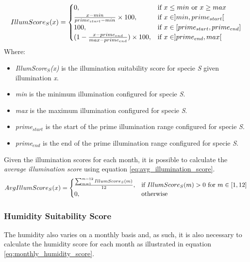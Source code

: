 \begin{equation}
\centering
IllumScore_{S}(x) = 
\begin{cases}
    0, & \text{if } x \leq min \text{ or } x \geq max \\
    \frac{x - min}{prime_{start} - min} \times 100, & \text{if } x \in ]min,prime_{start}[ \\
    100, & \text{if } x \in [prime_{start},prime_{end}] \\
    (1 - \frac{x - prime_{end}}{max-prime_{end}}) \times 100, & \text{if } x \in ]prime_{end},max[ \\
\end{cases}
\label{eq:monthly_illumination_score}
\end{equation}
Where:
\begin{itemize}
\item \textit{IllumScore$_{S}$(x)} is the illumination suitability score for specie \textit{S} given illumination \textit{x}.
\item \textit{min} is the minimum illumination configured for specie \textit{S}.
\item \textit{max} is the maximum illumination configured for specie \textit{S}.
\item \textit{prime$_{start}$} is the start of the prime illumination range configured for specie \textit{S}.
\item \textit{prime$_{end}$} is the end of the prime illumination range configured for specie \textit{S}.
\end{itemize}

Given the illumination scores for each month, it is possible to calculate the \textit{average illumination score} using equation \ref{eq:avg_illumination_score}.
\begin{equation}
\centering
AvgIllumScore_{S}(x) =
\begin{cases}
	\frac{\sum_{m=1}^{m=12} IllumScore_{S}(m)}{12}, & \text{if } IllumScore_{S}(m) > 0 \text{ for } m \in [1,12] \\
    0,              & \text{otherwise}
\end{cases}
\label{eq:avg_illumination_score}
\end{equation}

\subsubsection{Humidity Suitability Score}

The humidity also varies on a monthly basis and, as such, it is also necessary to calculate the humidity score for each month as illustrated in equation \ref{eq:monthly_humidity_score}.

